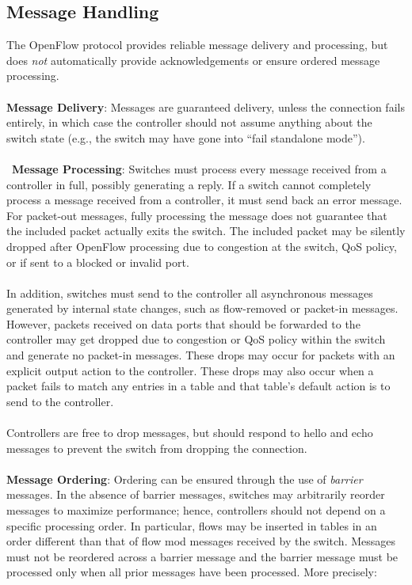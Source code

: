 \documentclass[10pt]{article}
\begin{document}
\subsection{Message Handling}
The OpenFlow protocol provides reliable message delivery and processing, but does \emph{not} automatically provide acknowledgements or ensure ordered message processing.
\\\\
\textbf{Message Delivery}: Messages are guaranteed delivery, unless the connection fails entirely, in which case the controller should not assume anything about the switch state (e.g., the switch may have gone into ``fail standalone mode'').
\\\\\
\textbf{Message Processing}: Switches must process every message received from a controller in full, possibly generating a reply.  If a switch cannot completely process a message received from a controller, it must send back an error message. For packet-out messages, fully processing the message does not guarantee that the included packet actually exits the switch.  The included packet may be silently dropped after OpenFlow processing due to congestion at the switch, QoS policy, or if sent to a blocked or invalid port.  
\\\\
In addition, switches must send to the controller all asynchronous messages generated by internal state changes, such as flow-removed or packet-in messages.  However, packets received on data ports that should be forwarded to the controller may get dropped due to congestion or QoS policy within the switch and generate no packet-in messages.  These drops may occur for packets with an explicit output action to the controller.  These drops may also occur when a packet fails to match any entries in a table and that table's default action is to send to the controller.
\\\\
Controllers are free to drop messages, but should respond to hello and echo messages to prevent the switch from dropping the connection.
\\\\
\textbf{Message Ordering}: Ordering can be ensured through the use of \emph{barrier} messages.  In the absence of barrier messages, switches may arbitrarily reorder messages to maximize performance; hence, controllers should not depend on a specific processing order. In particular, flows may be inserted in tables in an order different than that of flow mod messages received by the switch.  Messages must not be reordered across a barrier message and the barrier message must be processed only when all prior messages have been processed.  More precisely:
\end{document}
